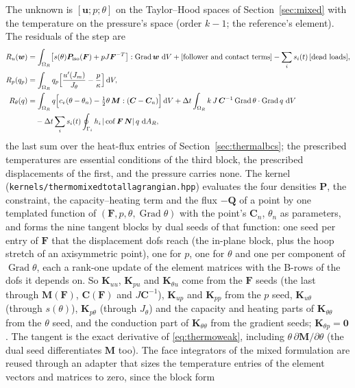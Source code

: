 \documentclass[11pt]{article}
\newcommand{\ud}{\,\mathrm{d}}
\newcommand{\Grad}{\operatorname{Grad}}
\newcommand{\cof}{\operatorname{cof}}
\newcommand{\bu}{\bm{u}}
\newcommand{\bw}{\bm{w}}
\newcommand{\bN}{\bm{N}}
\newcommand{\bP}{\bm{P}}
\newcommand{\bF}{\bm{F}}
\newcommand{\bC}{\bm{C}}
\newcommand{\bQ}{\bm{Q}}
\newcommand{\bK}{\bm{K}}
\newcommand{\bM}{\bm{M}}
\DeclareRobustCommand{\file}[1]{{\def\_{\textunderscore\allowbreak}\texttt{#1}}}
\begin{document}
The unknown is $[\bu; p; \theta]$ on the Taylor--Hood spaces of
Section~\ref{sec:mixed} with the temperature on the pressure's space
(order $k - 1$; the reference's element).  The residuals of the step are
\begin{align}
  R_u(\bw) &= \int_{\Omega_R} \bigl[s(\theta)\bP_{\mathrm{iso}}(\bF) + pJ\bF^{-T}\bigr]:\Grad\bw\,\ud V + [\text{follower and contact terms}] - \sum_i s_i(t)\,[\text{dead loads}], \notag\\
  R_p(q_p) &= \int_{\Omega_R} q_p\Bigl[\frac{u'(J_m)}{J_\theta} - \frac{p}{\kappa}\Bigr]\ud V, \label{eq:thermoweak}\\
  R_\theta(q) &= \int_{\Omega_R} q\Bigl[c_v(\theta - \theta_n) - \tfrac12\theta\,\bM:(\bC - \bC_n)\Bigr]\ud V + \Delta t\int_{\Omega_R} k\,J\,\bC^{-1}\Grad\theta\cdot\Grad q\,\ud V \notag\\
  &\quad - \Delta t\sum_i s_i(t)\oint_{\Gamma_i} h_i\,|\cof\bF\,\bN|\,q\,\ud A_R, \notag
\end{align}
the last sum over the heat-flux entries of Section~\ref{sec:thermalbcs};
the prescribed temperatures are essential conditions of the third block, the
prescribed displacements of the first, and the pressure carries none.  The
kernel (\file{kernels/thermo\_mixed\_total\_lagrangian.hpp}) evaluates the
four densities $\bP$, the constraint, the capacity--heating term and the
flux $-\bQ$ of a point by one templated function of $(\bF, p, \theta, \Grad\theta)$
with the point's $\bC_n$, $\theta_n$ as parameters, and forms the nine
tangent blocks by dual seeds of that function: one seed per entry of $\bF$
that the displacement dofs reach (the in-plane block, plus the hoop stretch
of an axisymmetric point), one for $p$, one for $\theta$ and one per
component of $\Grad\theta$, each a rank-one update of the element matrices
with the B-rows of the dofs it depends on.  So $\bK_{uu}$, $\bK_{pu}$ and
$\bK_{\theta u}$ come from the $\bF$ seeds (the last through
$\bM(\bF)$, $\bC(\bF)$ and $J\bC^{-1}$), $\bK_{up}$ and $\bK_{pp}$ from the
$p$ seed, $\bK_{u\theta}$ (through $s(\theta)$), $\bK_{p\theta}$ (through
$J_\theta$) and the capacity and heating parts of $\bK_{\theta\theta}$ from
the $\theta$ seed, and the conduction part of $\bK_{\theta\theta}$ from the
gradient seeds; $\bK_{\theta p} = \bm 0$.  The tangent is the exact
derivative of \eqref{eq:thermoweak}, including $\theta\,\partial\bM/\partial\theta$
(the dual seed differentiates $\bM$ too).  The face integrators of the
mixed formulation are reused through an adapter that sizes the temperature
entries of the element vectors and matrices to zero, since the block form
\end{document}
